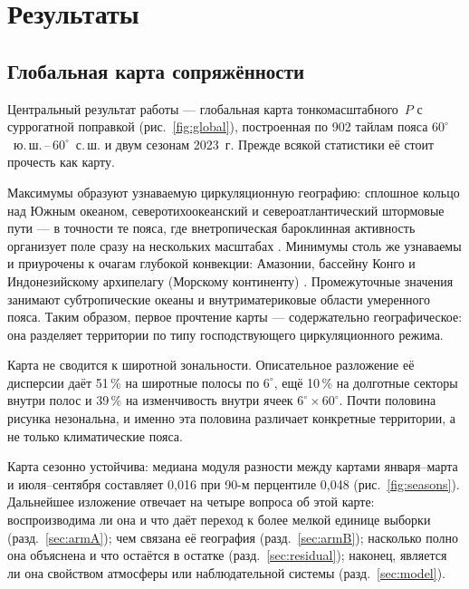 \documentclass[11pt,a4paper]{article}
\begin{document}
\section{Результаты}
\label{sec:results}

\subsection{Глобальная карта сопряжённости}
\label{sec:map}

Центральный результат работы --- глобальная карта тонкомасштабного~$P$ с суррогатной поправкой (рис.~\ref{fig:global}), построенная по 902 тайлам пояса $60^\circ$~ю.\,ш.\,--\,$60^\circ$~с.\,ш. и двум сезонам 2023~г. Прежде всякой статистики её стоит прочесть как карту.

Максимумы образуют узнаваемую циркуляционную географию: сплошное кольцо над Южным океаном, северотихоокеанский и североатлантический штормовые пути --- в точности те пояса, где внетропическая бароклинная активность организует поле сразу на нескольких масштабах \cite{HoskinsValdes1990,Chang2002,HoskinsHodges2005,Shaw2016}. Минимумы столь же узнаваемы и приурочены к очагам глубокой конвекции: Амазонии, бассейну Конго и Индонезийскому архипелагу (Морскому континенту) \cite{NealeSlingo2003,Feng2021}. Промежуточные значения занимают субтропические океаны и внутриматериковые области умеренного пояса. Таким образом, первое прочтение карты --- содержательно географическое: она разделяет территории по типу господствующего циркуляционного режима.

Карта не сводится к широтной зональности. Описательное разложение её дисперсии даёт 51\,\% на широтные полосы по $6^\circ$, ещё 10\,\% на долготные секторы внутри полос и 39\,\% на изменчивость внутри ячеек $6^\circ\times60^\circ$. Почти половина рисунка незональна, и именно эта половина различает конкретные территории, а не только климатические пояса.

Карта сезонно устойчива: медиана модуля разности между картами января--марта и июля--сентября составляет 0,016 при 90-м перцентиле 0,048 (рис.~\ref{fig:seasons}). Дальнейшее изложение отвечает на четыре вопроса об этой карте: воспроизводима ли она и что даёт переход к более мелкой единице выборки (разд.~\ref{sec:armA}); чем связана её география (разд.~\ref{sec:armB}); насколько полно она объяснена и что остаётся в остатке (разд.~\ref{sec:residual}); наконец, является ли она свойством атмосферы или наблюдательной системы (разд.~\ref{sec:model}).
\end{document}
